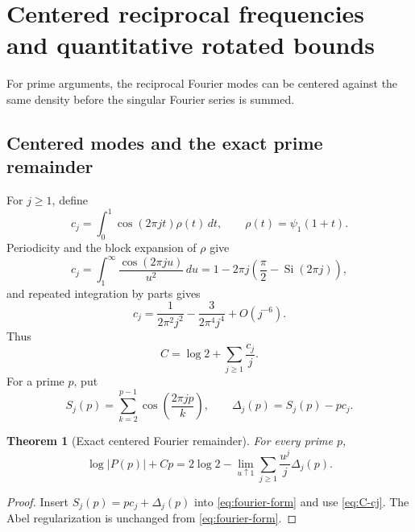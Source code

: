\documentclass[11pt]{amsart}
\numberwithin{equation}{section}
\newtheorem{theorem}{Theorem}[section]
\theoremstyle{definition}
\theoremstyle{remark}
\begin{document}
\section{Centered reciprocal frequencies and quantitative rotated bounds}
\label{sec:frequency-centered}

For prime arguments, the reciprocal Fourier modes can be centered against
the same density before the singular Fourier series is summed.

\subsection{Centered modes and the exact prime remainder}

For \(j\ge1\), define
\begin{equation}\label{eq:cj-def}
 c_j=\int_0^1\cos(2\pi jt)\rho(t)\,dt,
 \qquad \rho(t)=\psi_1(1+t).
\end{equation}
Periodicity and the block expansion of \(\rho\) give
\begin{equation}\label{eq:cj-integral}
 c_j=\int_1^\infty\frac{\cos(2\pi ju)}{u^2}\,du
 =1-2\pi j\left(\frac\pi2-\operatorname{Si}(2\pi j)\right),
\end{equation}
and repeated integration by parts gives
\begin{equation}\label{eq:cj-asymptotic}
 c_j=\frac{1}{2\pi^2j^2}-\frac{3}{2\pi^4j^4}+O(j^{-6}).
\end{equation}
Thus
\begin{equation}\label{eq:C-cj}
 C=\log2+\sum_{j\ge1}\frac{c_j}{j}.
\end{equation}
For a prime \(p\), put
\begin{equation}\label{eq:Sj-Deltaj}
 S_j(p)=\sum_{k=2}^{p-1}\cos\!\left(\frac{2\pi jp}{k}\right),
 \qquad \Delta_j(p)=S_j(p)-pc_j.
\end{equation}

\begin{theorem}[Exact centered Fourier remainder]\label{thm:centered-Fourier-prime}
For every prime \(p\),
\begin{equation}\label{eq:centered-Fourier-prime}
 \log|P(p)|+Cp
 =2\log2-\lim_{u\uparrow1}\sum_{j\ge1}\frac{u^j}{j}\Delta_j(p).
\end{equation}
\end{theorem}

\begin{proof}
Insert \(S_j(p)=pc_j+\Delta_j(p)\) into
\eqref{eq:fourier-form} and use \eqref{eq:C-cj}.  The Abel regularization is
unchanged from \eqref{eq:fourier-form}.
\end{proof}
\end{document}
